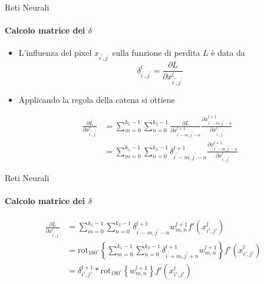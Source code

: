 \documentclass[
 ]{beamer}
\begin{document}
\begin{frame}{Reti Neurali}
    \framesubtitle{Calcolo matrice dei $\delta$}
    
     \begin{itemize} [<+->]
         \setlength\itemsep{2em}
         \item \large L'influenza del pixel $x_{i^{\prime},j^{\prime}}$ sulla funzione di perdita $L$ è data da
         \begin{equation*}
             \delta_{i^{\prime},j^{\prime}}^l = \frac{\partial L}{\partial x_{i^{\prime},j^{\prime}}^l}         
         \end{equation*}         
         
         \item \large Applicando la regola della catena si ottiene
     
    \begin{equation*}
        \begin{split}
           \frac{\partial L}{\partial x_{i^{\prime},j^{\prime}}^{l}} &= \sum_{m = 0}^{k_1 -1} \sum_{n = 0}^{k_2 -1} \frac{\partial L}{\partial x_{i^{\prime}-m, j^{\prime}-n}^{l+1}}\frac{\partial x_{i^{\prime}-m, j^{\prime}-n}^{l+1}}{\partial x_{i^{\prime},j^{\prime}}^l} \\[10pt]            
              &= \sum_{m = 0}^{k_1 -1} \sum_{n = 0}^{k_2 -1} \delta^{l+1}_{i^{\prime}-m, j^{\prime}-n} \frac{\partial x_{i^{\prime}-m, j^{\prime}-n}^{l+1}}{\partial x_{i^{\prime},j^{\prime}}^l} 
        \end{split}   
     \end{equation*}    
    \end{itemize}     
\end{frame}

\begin{frame}{Reti Neurali}
    \framesubtitle{Calcolo matrice dei $\delta$}
     
    \begin{equation*}
        \begin{split}
          \frac{\partial L}{\partial x_{i^{\prime},j^{\prime}}^{l}} &= \sum_{m = 0}^{k_1 - 1} \sum_{n = 0}^{k_2 - 1} \delta^{l+1}_{i^{\prime} - m,j^{\prime} - n} w_{m,n}^{l+1} f'\left(x_{i',j'}^{l}\right) \\[10pt]
& = \text{rot}_{180^\circ} \left\{ \sum_{m = 0}^{k_1 - 1} \sum_{n = 0}^{k_2 - 1} \delta^{l+1}_{i^{\prime} + m,j^{\prime} + n} w_{m,n}^{l+1} \right\} f'\left(x_{i',j'}^{l}\right) \\[10pt]
&= \delta^{l+1}_{i',j'} \ast \text{rot}_{180^\circ} \left\{ w_{m,n}^{l+1} \right\} f'\left(x_{i',j'}^{l} \right)
        \end{split}   
     \end{equation*}        
\end{frame}
\end{document}
